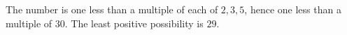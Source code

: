 The number is one less than a multiple of each of $2,3,5$, hence one less than a multiple of $30$. The least positive possibility is $\boxed{29}$.

